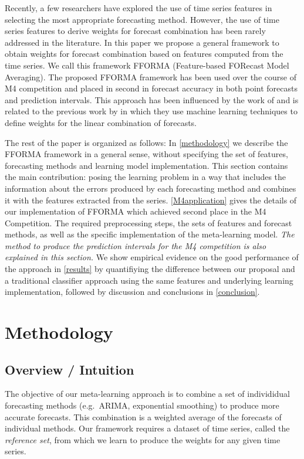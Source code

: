 \documentclass[11pt,a4paper,]{article}
\theoremstyle{definition}
\theoremstyle{definition}
\theoremstyle{definition}
\theoremstyle{remark}
\begin{document}
Recently, a few researchers have explored the use of time series
features in selecting the most appropriate forecasting method. However,
the use of time series features to derive weights for forecast
combination has been rarely addressed in the literature. In this paper
we propose a general framework to obtain weights for forecast
combination based on features computed from the time series. We call
this framework FFORMA (Feature-based FORecast Model Averaging). The
proposed FFORMA framework has been used over the course of M4
competition and placed in second in forecast accuracy in both point
forecasts and prediction intervals. This approach has been influenced by
the work of \textcite{fforms} and is related to the previous work by
\textcite{prudencio2004using} in which they use machine learning
techniques to define weights for the linear combination of forecasts.

The rest of the paper is organized as follows: In \autoref{methodology}
we describe the FFORMA framework in a general sense, without specifying
the set of features, forecasting methods and learning model
implementation. This section contains the main contribution: posing the
learning problem in a way that includes the information about the errors
produced by each forecasting method and combines it with the features
extracted from the series. \autoref{M4application} gives the details of
our implementation of FFORMA which achieved second place in the M4
Competition. The required preprocessing steps, the sets of features and
forecast methods, as well as the specific implementation of the
meta-learning model. \emph{The method to produce the prediction
intervals for the M4 competition is also explained in this section.} We
show empirical evidence on the good performance of the approach in
\autoref{results} by quantifiying the difference between our proposal
and a traditional classifier approach using the same features and
underlying learning implementation, followed by discussion and
conclusions in \autoref{conclusion}.

\section{Methodology}\label{methodology}

\subsection{Overview / Intuition}\label{overview-intuition}

The objective of our meta-learning approach is to combine a set of
individidual forecasting methods (e.g.~ARIMA, exponential smoothing) to
produce more accurate forecasts. This combination is a weighted average
of the forecasts of individual methods. Our framework requires a dataset
of time series, called the \emph{reference set}, from which we learn to
produce the weights for any given time series.
\end{document}

